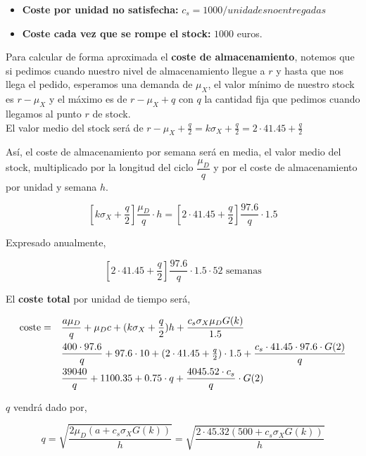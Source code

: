 \documentclass[a4paper,12pt]{article}
\begin{document}
\begin{itemize}
\begin{itemize}
\item[] \textbf{Coste por unidad no satisfecha:} $c_s = 1000 / unidades no entregadas$
\item[] \textbf{Coste cada vez que se rompe el stock:} $1000$ euros.
\end{itemize}

Para calcular de forma aproximada el \textbf{coste de almacenamiento}, notemos que si pedimos cuando nuestro nivel de almacenamiento llegue a $r$ y hasta que nos llega el pedido, esperamos una demanda de $\mu_X$, el valor m\'inimo de nuestro stock es $r - \mu_X$ y el m\'aximo es de $r - \mu_X + q$ con $q$ la cantidad fija que pedimos cuando llegamos al punto $r$ de stock. \\

El valor medio del stock ser\'a de $r - \mu_X + \frac{q}{2} = k\sigma_X + \frac{q}{2} = 2\cdot 41.45 + \frac{q}{2} $

As\'i, el coste de almacenamiento por semana ser\'a en media, el valor medio del stock, multiplicado por la longitud del ciclo $\dfrac{\mu_D}{q}$ y por el coste de almacenamiento por unidad y semana $h$.

$$ \left[ k\sigma_X + \frac{q}{2} \right] \frac{\mu_D}{q}\cdot h = \left[ 2\cdot 41.45 + \frac{q}{2} \right] \frac{97.6}{q} \cdot 1.5$$

Expresado anualmente,

$$ \left[ 2\cdot 41.45 + \frac{q}{2} \right] \frac{97.6}{q} \cdot 1.5 \cdot 52 \text{ semanas}$$


El \textbf{coste total} por unidad de tiempo ser\'a,

\begin{equation*}
\begin{array}{l l}
\text{coste} = & \dfrac{a\mu_D}{q} + \mu_D c + (k\sigma_X + \dfrac{q}{2}) h + \dfrac{c_s\sigma_X \mu_D G(k)}{1.5} \\[.3cm]
\, & \dfrac{400\cdot 97.6}{q} + 97.6\cdot 10 + (2\cdot 41.45 + \frac{q}{2})\cdot 1.5 + \dfrac{c_s\cdot 41.45 \cdot 97.6\cdot G(2)}{q}\\[.3cm]
\, & \dfrac{39040}{q} + 1100.35 + 0.75\cdot q + \dfrac{4045.52\cdot c_s}{q}\cdot G(2)
\end{array}
\end{equation*}


$q$ vendr\'a dado por,

$$ q = \sqrt{\frac{2\mu_D (a + c_s \sigma_X G(k))}{h}} = \sqrt{\frac{2\cdot 45.32(500 + c_s\sigma_X G(k))}{h}}$$
     
\end{itemize}
\end{document}

